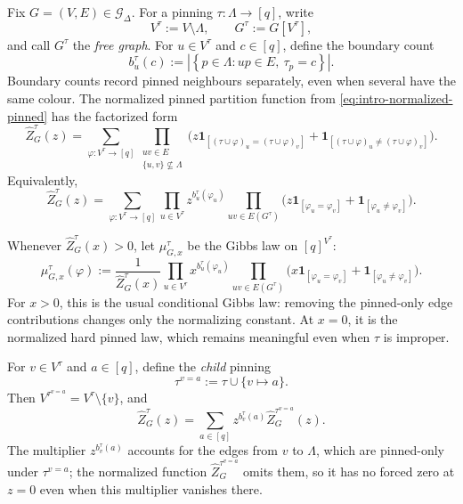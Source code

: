 \documentclass[11pt,reqno]{article}
\theoremstyle{plain}
\theoremstyle{definition}
\theoremstyle{remark}
\theoremstyle{definition}
\theoremstyle{remark}
\newcommand{\abs}[1]{\left|#1\right|}
\newcommand{\set}[1]{\left\{#1\right\}}
\newcommand{\one}[1]{\mathbf{1}_{\left[#1\right]}}   %
\newcommand{\Deg}{\Delta}                        %
\newcommand{\colours}{[q]}                        %
\newcommand{\bcount}{b}
\newcommand{\Gdeg}{\mathcal{G}_{\Deg}}
\newcommand{\nZpin}[2]{\widehat Z_{#1}^{#2}}
\newcommand{\mupin}[3]{\mu_{#1,#3}^{#2}}
\begin{document}
Fix \(G=(V,E)\in\Gdeg\).  For a pinning
\(\tau\colon\Lambda\to\colours\), write
\[
  V^\tau:=V\setminus\Lambda,
  \qquad
  G^\tau:=G[V^\tau],
\]
and call \(G^\tau\) the \emph{free graph}.  For \(u\in V^\tau\) and
\(c\in\colours\), define the boundary count
\begin{equation}\label{eq:pin-counts}
  \bcount_u^\tau(c)
  :=\abs{\set{p\in\Lambda:up\in E,\ \tau_p=c}}.
\end{equation}
Boundary counts record pinned neighbours separately, even when several
have the same colour.  The normalized pinned
partition function from \eqref{eq:intro-normalized-pinned} has the factorized
form
\begin{equation}\label{eq:potts-Z}
  \nZpin{G}{\tau}(z)
  =\sum_{\varphi\colon V^\tau\to\colours}
       \prod_{\substack{uv\in E\\\{u,v\}\not\subseteq\Lambda}}
       \bigl(z\one{(\tau\cup\varphi)_u=(\tau\cup\varphi)_v}
             +\one{(\tau\cup\varphi)_u\ne(\tau\cup\varphi)_v}\bigr).
\end{equation}
Equivalently,
\[
  \nZpin{G}{\tau}(z)
  =\sum_{\varphi\colon V^\tau\to\colours}
     \prod_{u\in V^\tau}z^{\bcount_u^\tau(\varphi_u)}
     \prod_{uv\in E(G^\tau)}
       \bigl(z\one{\varphi_u=\varphi_v}+\one{\varphi_u\ne\varphi_v}\bigr).
\]

Whenever \(\nZpin{G}{\tau}(x)>0\), let \(\mupin{G}{\tau}{x}\) be the
Gibbs law on \(\colours^{V^\tau}\):
\[
  \mupin{G}{\tau}{x}(\varphi)
  :=\frac{1}{\nZpin{G}{\tau}(x)}
     \prod_{u\in V^\tau}x^{\bcount_u^\tau(\varphi_u)}
     \prod_{uv\in E(G^\tau)}
       \bigl(x\one{\varphi_u=\varphi_v}+\one{\varphi_u\ne\varphi_v}\bigr).
\]
For \(x>0\), this is the usual conditional Gibbs law: removing the
pinned-only edge contributions changes only the normalizing constant.  At \(x=0\), it is the normalized hard
pinned law, which remains meaningful even when \(\tau\) is improper.

For \(v\in V^\tau\) and \(a\in\colours\), define the \emph{child} pinning
\[
  \tau^{v=a}:=\tau\cup\{v\mapsto a\}.
\]
Then \(V^{\tau^{v=a}}=V^\tau\setminus\{v\}\), and
\begin{equation}\label{eq:potts-colour-recursion}
  \nZpin{G}{\tau}(z)
  =\sum_{a\in\colours}
     z^{\bcount_v^\tau(a)}\nZpin{G}{\tau^{v=a}}(z).
\end{equation}
The multiplier \(z^{\bcount_v^\tau(a)}\) accounts for the edges from \(v\)
to \(\Lambda\), which are pinned-only under \(\tau^{v=a}\); the normalized
function \(\nZpin{G}{\tau^{v=a}}\) omits them, so it has no forced zero at
\(z=0\) even when this multiplier vanishes there.
\end{document}
